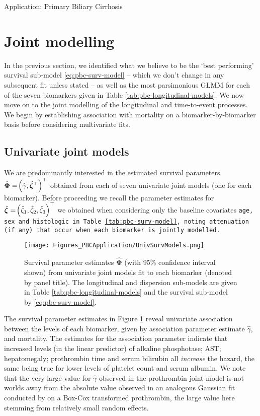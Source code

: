 \begin{chapter}{\label{cha:app-PBC}Application: Primary Biliary Cirrhosis}
  \section{Joint modelling}\label{sec:pbc-jointmodelling-parent}
  In the previous section, we identified what we believe to be the `best performing' survival sub-model \eqref{eq:pbc-surv-model} -- which we don't change in any subsequent fit unless stated -- as well as the most parsimonious GLMM for each of the seven biomarkers given in Table \ref{tab:pbc-longitudinal-models}. We now move on to the joint modelling of the longitudinal and time-to-event processes. We begin by establishing association with mortality on a biomarker-by-biomarker basis before considering multivariate fits.
  
  \subsection{Univariate joint models}\label{sec:pbc-jointmodelling-univs}
  We are predominantly interested in the estimated survival parameters $\hat{\bm{\Phi}}=\!\left(\hat{\gamma},\hat{\bm{\zeta}}^\top\right)^\top$ obtained from each of seven univariate joint models (one for each biomarker). Before proceeding we recall the parameter estimates for $\hat{\bm{\zeta}}=\!\left(\hat{\zeta}_1,\hat{\zeta}_2,\hat{\zeta}_3\right)^\top$ we obtained when considering only the baseline covariates \tt{age}, \tt{sex} and \tt{histologic} in Table \ref{tab:pbc-surv-model}, noting attenuation (if any) that occur when each biomarker is jointly modelled.
  
  \begin{figure}[ht]
      \centering
      \texttt{[image: Figures\_PBCApplication/UnivSurvModels.png]}
      \caption{Survival parameter estimates $\hat{\bm{\Phi}}$ (with 95\% confidence interval shown) from univariate joint models fit to each biomarker (denoted by panel title). The longitudinal and dispersion sub-models are given in Table \ref{tab:pbc-longitudinal-models} and the survival sub-model by \eqref{eq:pbc-surv-model}.}
      \label{fig:pbc-univariate-survivals}
  \end{figure}

  The survival parameter estimates in Figure \ref{fig:pbc-univariate-survivals} reveal univariate association between the levels of each biomarker, given by association parameter estimate $\hat{\gamma}$, and mortality. The estimates for the association parameter indicate that increased levels (in the linear predictor) of alkaline phosphotase; AST; hepatomegaly; prothrombin time and serum bilirubin all \textit{increase} the hazard, the same being true for lower levels of platelet count and serum albumin. We note that the very large value for $\hat{\gamma}$ observed in the prothrombin joint model is not worlds away from the absolute value observed in an analogous Gaussian fit conducted by \citet{Hickey2018} on a Box-Cox transformed prothrombin, the large value here stemming from relatively small random effects.


\end{chapter}
